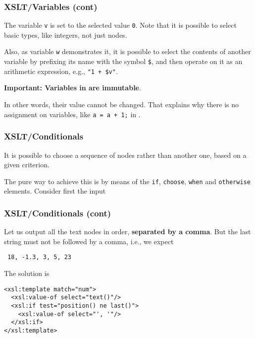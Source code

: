%
\begin{frame}[containsverbatim]
\frametitle{XSLT/Variables (cont)}

The variable \texttt{v} is set to the selected value \texttt{0}. Note
that it is possible to select basic types, like integers, not just
nodes.

\bigskip

Also, as variable \texttt{w} demonstrates it, it is possible to select
the contents of another variable by prefixing its name with the symbol
\texttt{\$}, and then operate on it as an arithmetic expression, e.g.,
\verb|"1 + $v"|.

\bigskip

\textbf{Important: Variables in \XSLT are immutable}. 

\bigskip

In other words, their value cannot be changed. That explains why there
is no assignment on variables, like \verb|a = a + 1;| in \Clang.

\end{frame}

%
\begin{frame}
\frametitle{XSLT/Conditionals}

It is possible to choose a sequence of nodes rather than another one,
based on a given criterion. 

\bigskip

The pure \XSLT way to achieve this is by means of the \texttt{if},
\texttt{choose}, \texttt{when} and \texttt{otherwise}
elements. Consider first the input

\end{frame}

%
\begin{frame}[containsverbatim]
\frametitle{XSLT/Conditionals (cont)}

Let us output all the text nodes in order, \textbf{separated by a
  comma}. But the last string must not be followed by a comma, i.e.,
we expect
\begin{center}\tt
18, -1.3, 3, 5, 23
\end{center}
The solution is
{\small
\begin{verbatim}
<xsl:template match="num">
  <xsl:value-of select="text()"/>
  <xsl:if test="position() ne last()">
    <xsl:value-of select="', '"/>
  </xsl:if>
</xsl:template>
\end{verbatim}
}

\end{frame}

